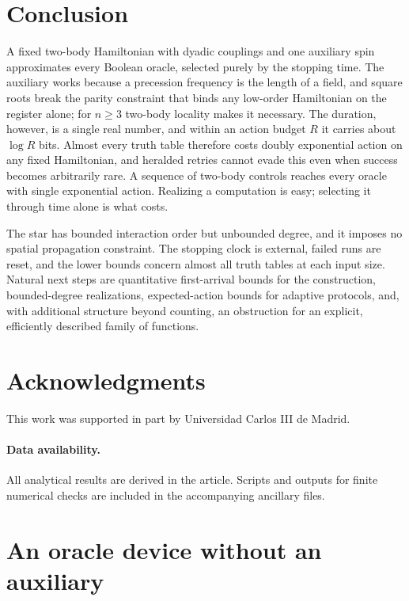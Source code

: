 \documentclass[11pt,a4paper]{article}
\begin{document}
\section{Conclusion}
\label{sec:discussion}

A fixed two-body Hamiltonian with dyadic couplings and one auxiliary spin approximates every Boolean oracle, selected purely by the stopping time. The auxiliary works because a precession frequency is the length of a field, and square roots break the parity constraint that binds any low-order Hamiltonian on the register alone; for $n\ge3$ two-body locality makes it necessary. The duration, however, is a single real number, and within an action budget $R$ it carries about $\log R$ bits. Almost every truth table therefore costs doubly exponential action on any fixed Hamiltonian, and heralded retries cannot evade this even when success becomes arbitrarily rare. A sequence of two-body controls reaches every oracle with single exponential action. Realizing a computation is easy; selecting it through time alone is what costs.

The star has bounded interaction order but unbounded degree, and it imposes no spatial propagation constraint. The stopping clock is external, failed runs are reset, and the lower bounds concern almost all truth tables at each input size. Natural next steps are quantitative first-arrival bounds for the construction, bounded-degree realizations, expected-action bounds for adaptive protocols, and, with additional structure beyond counting, an obstruction for an explicit, efficiently described family of functions.

\section*{Acknowledgments}
This work was supported in part by Universidad Carlos III de Madrid.

\paragraph*{Data availability.}
All analytical results are derived in the article. Scripts and outputs for finite numerical checks are included in the accompanying ancillary files.

\appendix

\section{An oracle device without an auxiliary}
\label{app:no-auxiliary}
\end{document}
